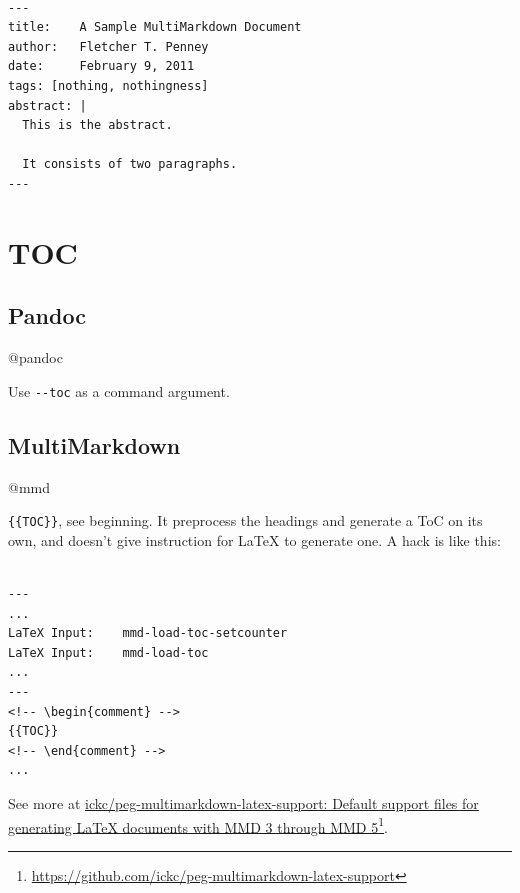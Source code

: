 \begin{adjustwidth}{2.5em}{2.5em}
\begin{verbatim}

---
title:    A Sample MultiMarkdown Document  
author:   Fletcher T. Penney  
date:     February 9, 2011  
tags: [nothing, nothingness]
abstract: |
  This is the abstract.

  It consists of two paragraphs.
---

\end{verbatim}
\end{adjustwidth}

\section{TOC}
\label{toc}

\subsection{Pandoc}
\label{pandoc}

@pandoc

Use \texttt{-{}-toc} as a command argument.

\subsection{MultiMarkdown}
\label{multimarkdown}

@mmd

\texttt{\{\{TOC\}\}}, see beginning. It preprocess the headings and generate a ToC on its own, and doesn't give instruction for LaTeX to generate one. A hack is like this:

\begin{adjustwidth}{2.5em}{2.5em}
\begin{verbatim}

---
...
LaTeX Input:    mmd-load-toc-setcounter
LaTeX Input:    mmd-load-toc
...
---
<!-- \begin{comment} -->
{{TOC}}
<!-- \end{comment} -->
...

\end{verbatim}
\end{adjustwidth}

See more at \href{https://github.com/ickc/peg-multimarkdown-latex-support}{ickc\slash peg-multimarkdown-latex-support: Default support files for generating LaTeX documents with MMD 3 through MMD 5}\footnote{\href{https://github.com/ickc/peg-multimarkdown-latex-support}{https:/\slash github.com\slash ickc\slash peg-multimarkdown-latex-support}}.

